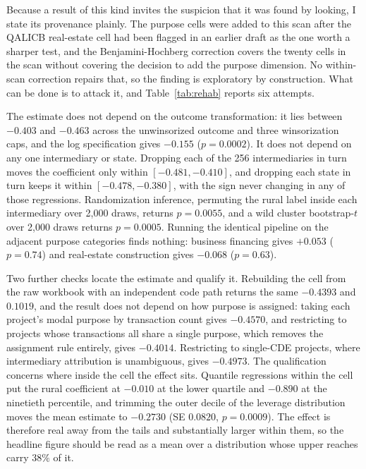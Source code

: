 Because a result of this kind invites the suspicion that it was found by
looking, I state its provenance plainly. The purpose cells were added to
this scan after the QALICB real-estate cell had been flagged in an earlier
draft as the one worth a sharper test, and the Benjamini-Hochberg
correction covers the twenty cells in the scan without covering the
decision to add the purpose dimension. No within-scan correction repairs
that, so the finding is exploratory by construction. What can be done is to
attack it, and Table~\ref{tab:rehab} reports six attempts.

The estimate does not depend on the outcome transformation: it lies between
$-0.403$ and $-0.463$ across the unwinsorized outcome and three
winsorization caps, and the log specification gives $-0.155$
($p = 0.0002$). It does not depend on any one intermediary or state.
Dropping each of the 256 intermediaries in turn moves the coefficient only
within $[-0.481, -0.410]$, and dropping each state in turn keeps it within
$[-0.478, -0.380]$, with the sign never changing in any of those
regressions. Randomization inference, permuting the rural label inside each
intermediary over 2{,}000 draws, returns $p = 0.0055$, and a wild cluster
bootstrap-$t$ over 2{,}000 draws returns $p = 0.0005$. Running the identical
pipeline on the adjacent purpose categories finds nothing: business
financing gives $+0.053$ ($p = 0.74$) and real-estate construction gives
$-0.068$ ($p = 0.63$).

Two further checks locate the estimate and qualify it. Rebuilding the cell
from the raw workbook with an independent code path returns the same
$-0.4393$ and $0.1019$, and the result does not depend on how purpose is
assigned: taking each project's modal purpose by transaction count gives
$-0.4570$, and restricting to projects whose transactions all share a
single purpose, which removes the assignment rule entirely, gives
$-0.4014$. Restricting to single-CDE projects, where intermediary
attribution is unambiguous, gives $-0.4973$. The qualification concerns
where inside the cell the effect sits. Quantile regressions within the cell
put the rural coefficient at $-0.010$ at the lower quartile and $-0.890$ at
the ninetieth percentile, and trimming the outer decile of the leverage
distribution moves the mean estimate to $-0.2730$ (SE $0.0820$,
$p = 0.0009$). The effect is therefore real away from the tails and
substantially larger within them, so the headline figure should be read as
a mean over a distribution whose upper reaches carry $38\%$ of it.

